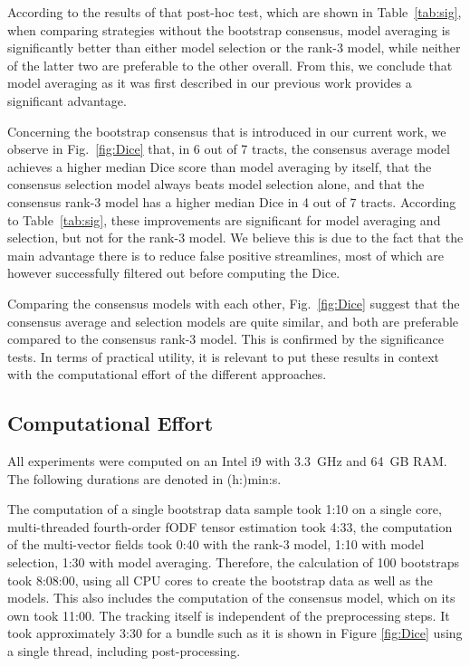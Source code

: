 According to the results of that post-hoc test, which are shown in Table~\ref{tab:sig}, when comparing strategies without the bootstrap consensus,
model averaging is significantly better than either model selection or the rank-3 model, while neither of the latter two are preferable to the other overall. From this, we conclude that model averaging as it was first described in our previous work \cite{Gruen:2021} provides a significant advantage.

Concerning the bootstrap consensus that is introduced in our current work, we observe in Fig.~\ref{fig:Dice} that, in 6 out of 7 tracts, the consensus average model achieves a higher median Dice score than model averaging by itself, that the consensus selection model always beats model selection alone, and that the consensus rank-3 model has a higher median Dice in 4 out of 7
tracts. According to Table~\ref{tab:sig}, these improvements are significant for model averaging and selection, but not for the rank-3 model. We believe this is due to the fact that the main advantage there is to reduce false positive streamlines, most of which are however successfully filtered out before computing the Dice.

Comparing the consensus models with each other, Fig.~\ref{fig:Dice} suggest that the consensus average and selection models are quite similar, and both are
preferable compared to the consensus rank-3 model. This is confirmed by the significance tests. In terms of practical utility, it is relevant to put these results in context with the computational effort of the different approaches.

\subsection{Computational Effort}
All experiments were computed on an Intel i9 with 3.3~GHz and 64~GB RAM. The
following durations are denoted in (h:)min:s.

The computation of a single bootstrap data sample took 1:10 on a single core,
multi-threaded fourth-order fODF tensor estimation took 4:33, the computation of the multi-vector fields took 0:40 with the rank-3 model, 1:10 with model selection, 1:30 with model averaging. Therefore, the calculation of 100 bootstraps took 8:08:00, using all CPU cores to create the bootstrap data as well as the
models. This also includes the computation of the consensus model, which on its
own took 11:00. The tracking itself is independent of the preprocessing steps.
It took approximately 3:30 for a bundle such as it is shown in Figure
\ref{fig:Dice} using a single thread, including post-processing.  



